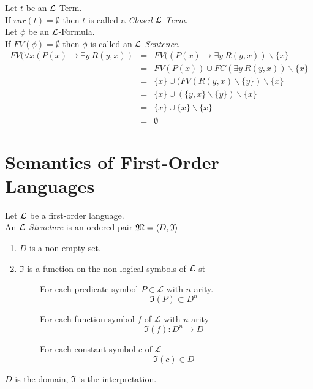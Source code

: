\documentclass[11pt,a4paper]{article}
\begin{document}
Let $t$ be an $\mathcal{L}$-Term.\\
If $var(t)=\emptyset$ then $t$ is called a \textit{Closed $\mathcal{L}$-Term}.\\

Let $\phi$ be an $\mathcal{L}$-Formula.\\
If $FV(\phi)=\emptyset$ then $\phi$ is called an \textit{$\mathcal{L}$-Sentence}.\\

\[\begin{array}{rcl}
FV(\forall x(P(x)\to\exists y\ R(y,x))&=&FV((P(x)\to\exists y\ R(y,x))\backslash\{x\}\\
&=&FV(P(x))\cup FC(\exists y\ R(y,x))\backslash\{x\}\\
&=&\{x\}\cup(FV(R(y,x)\backslash\{y\})\backslash\{x\}\\
&=&\{x\}\cup(\{y,x\}\backslash\{y\})\backslash\{x\}\\
&=&\{x\}\cup\{x\}\backslash\{x\}\\
&=&\emptyset
\end{array}\]


\section{Semantics of First-Order Languages}

Let $\mathcal{L}$ be a first-order language.\\
An \textit{$\mathcal{L}$-Structure} is an ordered pair $\mathfrak{M}=\langle D,\mathfrak{I}\rangle$
\begin{enumerate}
	\item $D$ is a non-empty set.
	\item $\mathfrak{I}$ is a function on the non-logical symbols of $\mathcal{L}$ st
	\begin{itemize}
		\item[-] For each predicate symbol $P\in\mathcal{L}$ with $n$-arity.
		$$\mathfrak{I}(P)\subset D^n$$
		\item[-] For each function symbol $f$ of $\mathcal{L}$ with $n$-arity
		$$\mathfrak{I}(f):D^n\to D$$
		\item[-] For each constant symbol $c$ of $\mathcal{L}$
		$$\mathfrak{I}(c)\in D$$
	\end{itemize}
\end{enumerate}
\nb $D$ is the domain, $\mathfrak{I}$ is the interpretation.\\
\end{document}
